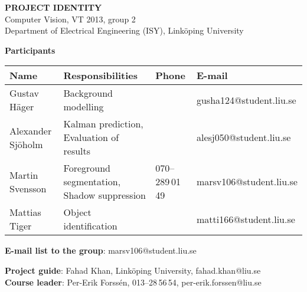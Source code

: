 \begin{center}
    \vspace*{4\baselineskip}

	\textbf{\huge PROJECT IDENTITY} \\
	\vspace*{0.5\baselineskip}
	Computer Vision, VT 2013, group 2 \\
	Department of Electrical Engineering (ISY), Link\"{o}ping University
	
	\vspace*{2\baselineskip}
	\textbf{\LARGE Participants}


	{\footnotesize 
	\begin{tabular}{|p{2.7cm}|p{5cm}|p{2cm}|p{3.4cm}|}
		\hline
			\textbf{Name} & \textbf{Responsibilities} & \textbf{Phone} & \textbf{E-mail} \\
		\hline
		Gustav Häger & Background modelling &  & gusha124@student.liu.se \\
		\hline
		Alexander Sjöholm & Kalman prediction, \newline Evaluation of results &  & alesj050@student.liu.se \\
		\hline
		Martin Svensson & Foreground segmentation, \newline Shadow suppression & 070--289\,01\,49 & marsv106@student.liu.se \\
		\hline
		Mattias Tiger & Object identification &  & matti166@student.liu.se \\
		\hline
	\end{tabular}
	}

{\footnotesize 
\textbf{E-mail list to the group}: marsv106@student.liu.se \\
\vspace{1\baselineskip}

\textbf{Project guide}: Fahad Khan, Link\"{o}ping University, fahad.khan@liu.se \\
\textbf{Course leader}: Per-Erik Forssén, 013--28\,56\,54, per-erik.forssen@liu.se \\
}

\end{center}
